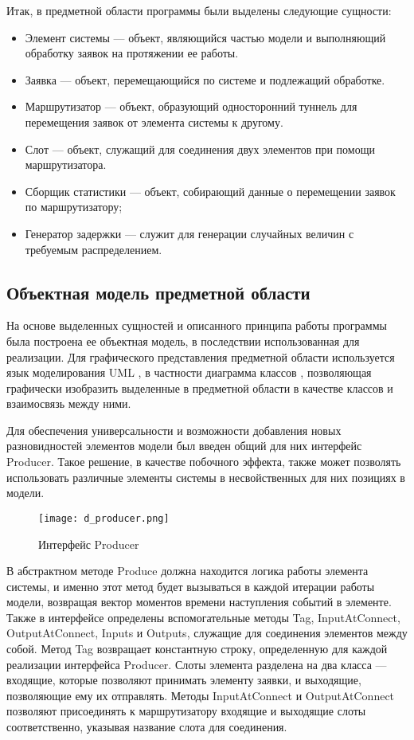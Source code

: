 Итак, в предметной области программы были выделены следующие сущности:
\begin{itemize}
	\item Элемент системы --- объект, являющийся частью модели и выполняющий обработку заявок на протяжении ее работы.
	\item Заявка --- объект, перемещающийся по системе и подлежащий обработке.
	\item Маршрутизатор --- объект, образующий односторонний туннель для перемещения заявок от элемента системы к другому.
	\item Слот --- объект, служащий для соединения двух элементов при помощи маршрутизатора.
	\item Сборщик статистики --- объект, собирающий данные о перемещении заявок по маршрутизатору;
	\item Генератор задержки --- служит для генерации случайных величин с требуемым распределением.
\end{itemize}

\subsection{Объектная модель предметной области}
На основе выделенных сущностей и описанного принципа работы программы была построена ее объектная модель, в последствии использованная для реализации. Для графического представления предметной области используется язык моделирования UML \cite{pilone2005uml}, в частности диаграмма классов \cite{herchi2012user}, позволяющая графически изобразить выделенные в предметной области в качестве классов и взаимосвязь между ними.

Для обеспечения универсальности и возможности добавления новых разновидностей элементов модели был введен общий для них интерфейс Producer. Такое решение, в качестве побочного эффекта, также может позволять использовать различные элементы системы в несвойственных для них позициях в модели.
\begin{figure}[H]
	\centering
	\texttt{[image: d\_producer.png]}
	\caption{Интерфейс Producer}
	\label{d_producer}
\end{figure}

В абстрактном методе Produce должна находится логика работы элемента системы, и именно этот метод будет вызываться в каждой итерации работы модели, возвращая вектор моментов времени наступления событий в элементе. Также в интерфейсе определены вспомогательные методы Tag, InputAtConnect, OutputAtConnect, Inputs и Outputs, служащие для соединения элементов между собой. Метод Tag возвращает константную строку, определенную для каждой реализации интерфейса Producer. Слоты элемента разделена на два класса --- входящие, которые позволяют принимать элементу заявки, и выходящие, позволяющие ему их отправлять. Методы InputAtConnect и OutputAtConnect позволяют присоединять к маршрутизатору входящие и выходящие слоты соответственно, указывая название слота для соединения. 

